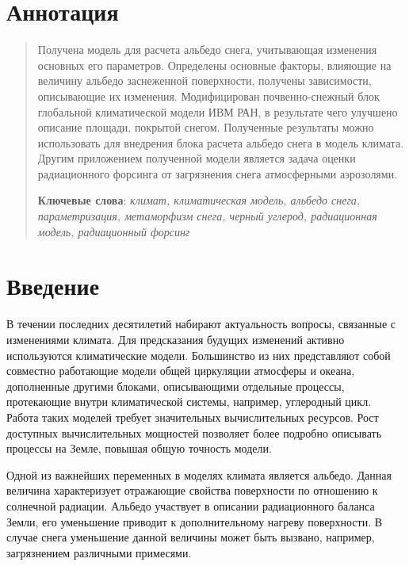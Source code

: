 \documentclass[a4paper, fontsize=14pt]{scrartcl}
\begin{document}
\author{Черненков Алексей Юрьевич}

\section*{Аннотация}
\begin{abstract}

Получена модель для расчета альбедо снега, учитывающая изменения основных его параметров. Определены основные факторы, влияющие на величину альбедо заснеженной поверхности, получены зависимости, описывающие их изменения. Модифицирован почвенно-снежный блок глобальной климатической модели ИВМ РАН, в результате чего улучшено описание площади, покрытой снегом. Полученные результаты можно использовать для внедрения блока расчета альбедо снега в модель климата. Другим приложением полученной модели является задача оценки радиационного форсинга от загрязнения снега атмосферными аэрозолями. 
  
  \bigskip
  \textbf{Ключевые слова}: \emph{климат, климатическая модель, альбедо снега, параметризация, метаморфизм снега, черный углерод, радиационная модель, радиационный форсинг}
\end{abstract}


\newpage
{}
{}
\tableofcontents


\newpage
\section*{Введение}

В течении последних десятилетий набирают актуальность вопросы, связанные с изменениями климата. Для предсказания будущих изменений активно используются климатические модели. Большинство из них представляют собой совместно работающие модели общей циркуляции атмосферы и океана, дополненные другими блоками, описывающими отдельные процессы, протекающие внутри климатической системы, например, углеродный цикл. Работа таких моделей требует значительных вычислительных ресурсов. Рост доступных вычислительных мощностей позволяет более подробно описывать процессы на Земле, повышая общую точность модели. 

Одной из важнейших переменных в моделях климата является альбедо. Данная величина характеризует отражающие свойства поверхности по отношению к солнечной радиации. Альбедо участвует в описании радиационного баланса Земли, его уменьшение приводит к дополнительному нагреву поверхности. В случае снега уменьшение данной величины может быть вызвано, например, загрязнением различными примесями.
\end{document}
